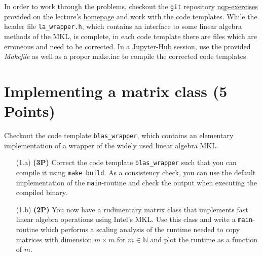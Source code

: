 \documentclass[a4paper, 12pt]{article}
\begin{document}
%
In order to work through the problems, checkout the \texttt{git} repository \href{git@gitlab.physik.uni-muenchen.de:nqp/nqp-exercises.git}{nqp-exercises} provided on the lecture's \href{https://www2.physik.uni-muenchen.de/lehre/vorlesungen/sose_23/nqp/uebungen/index.html}{homepage} and work with the code templates.
%
While the header file \texttt{la\_wrapper.h}, which contains an interface to some linear algebra methods of the MKL, is complete, in each code template there are files which are erroneous and need to be corrected.
%
In a \href{https://jupyter.physik.uni-muenchen.de}{Jupyter-Hub} session, use the provided \textit{Makefile} as well as a proper make.inc to compile the corrected code templates.
%

%
\section{Implementing a matrix class \textbf{(5 Points)}}
%
Checkout the code template \texttt{blas\_wrapper}, which contains an elementary implementation of a wrapper of the widely used linear algebra MKL.
%
\begin{itemize}
	\item[(1.a)] \textbf{(3P)}
	Correct the code template \texttt{blas\_wrapper} such that you can compile it using \texttt{make build}.
	As a consistency check, you can use the default implementation of the \texttt{main}-routine and check the output when executing the compiled binary.
	\item[(1.b)] \textbf{(2P)}
	You now have a rudimentary matrix class that implements fast linear algebra operations using Intel's MKL.
	Use this class and write a \texttt{main}-routine which performs a scaling analysis of the runtime needed to copy matrices with dimension $m \times m$ for $m\in\mathbb N$ and plot the runtime as a function of $m$.
\end{itemize}
%

%
\end{document}
